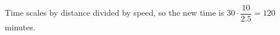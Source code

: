 Time scales by distance divided by speed, so the new time is $30\cdot\dfrac{10}{2.5}=\boxed{120}$ minutes.

